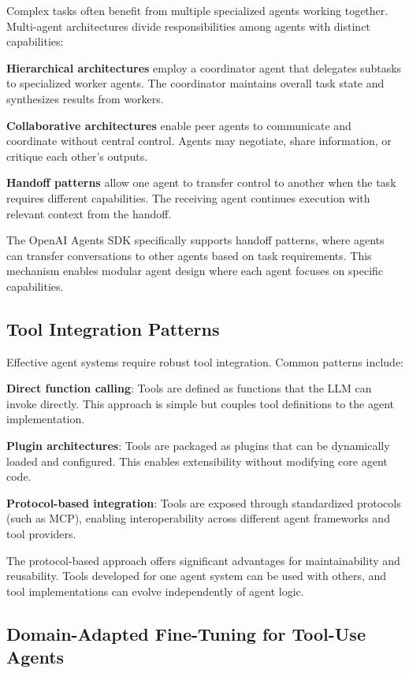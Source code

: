 Complex tasks often benefit from multiple specialized agents working together. Multi-agent architectures divide responsibilities among agents with distinct capabilities:

\textbf{Hierarchical architectures} employ a coordinator agent that delegates subtasks to specialized worker agents. The coordinator maintains overall task state and synthesizes results from workers.

\textbf{Collaborative architectures} enable peer agents to communicate and coordinate without central control. Agents may negotiate, share information, or critique each other's outputs.

\textbf{Handoff patterns} allow one agent to transfer control to another when the task requires different capabilities. The receiving agent continues execution with relevant context from the handoff.

The OpenAI Agents SDK specifically supports handoff patterns, where agents can transfer conversations to other agents based on task requirements. This mechanism enables modular agent design where each agent focuses on specific capabilities.

\subsection{Tool Integration Patterns}

Effective agent systems require robust tool integration. Common patterns include:

\textbf{Direct function calling}: Tools are defined as functions that the LLM can invoke directly. This approach is simple but couples tool definitions to the agent implementation.

\textbf{Plugin architectures}: Tools are packaged as plugins that can be dynamically loaded and configured. This enables extensibility without modifying core agent code.

\textbf{Protocol-based integration}: Tools are exposed through standardized protocols (such as MCP), enabling interoperability across different agent frameworks and tool providers.

The protocol-based approach offers significant advantages for maintainability and reusability. Tools developed for one agent system can be used with others, and tool implementations can evolve independently of agent logic.

\subsection{Domain-Adapted Fine-Tuning for Tool-Use Agents}


